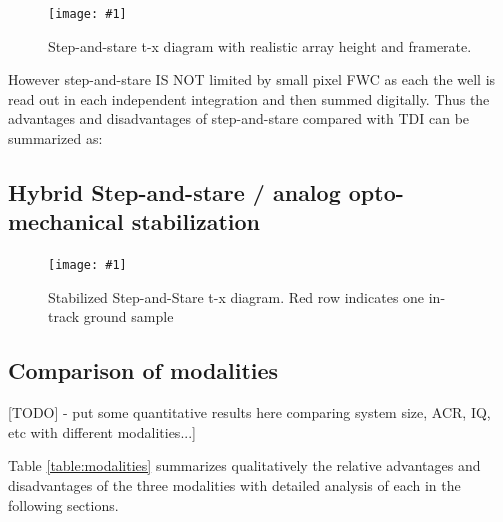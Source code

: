 \documentclass[10pt,journal]{IEEEtran}  %
\newcommand{\includefigure}[3]
{
  \begin{figure}[h!]
  \centering
  \texttt{[image: \#1]}
  \caption[]{#3}
  \label{#2}
  \end{figure}
}
\begin{document}
\includefigure{figures/step_stare_real.pgf}{fig:step_stare_real}{Step-and-stare t-x diagram with realistic array height and framerate.}

However step-and-stare IS NOT limited by small pixel FWC as each the well is read out in each independent integration and then summed digitally.  Thus the advantages and disadvantages of step-and-stare compared with TDI can be summarized as:


\subsection{Hybrid Step-and-stare / analog opto-mechanical stabilization}

\includefigure{figures/stab_step_stare.pgf}{fig:stab_step_stare}{Stabilized Step-and-Stare t-x diagram.  Red row indicates one in-track ground sample}

\subsection{Comparison of modalities}
[TODO] - put some quantitative results here comparing system size, ACR, IQ, etc with different modalities...]

Table \ref{table:modalities} summarizes qualitatively the relative advantages and disadvantages of the three modalities with detailed analysis of each in the following sections.
\end{document}
